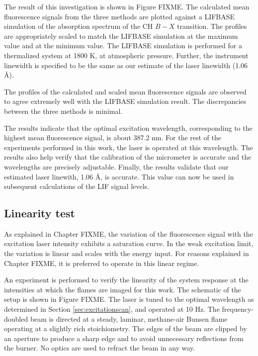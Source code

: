 The result of this investigation is shown in Figure FIXME.
The calculated mean fluorescence signals from the three methods are plotted against a LIFBASE simulation of the absorption spectrum of the CH \(B-X\) transition.
The profiles are appropriately scaled to match the LIFBASE simulation at the maximum value and at the minimum value.
The LIFBASE simulation is performed for a thermalized system at 1800 K, at atmospheric pressure.
Further, the instrument linewidth is specified to be the same as our estimate of the laser linewidth (1.06 \AA).

The profiles of the calculated and scaled mean fluorescence signals are observed to agree extremely well with the LIFBASE simulation result.
The discrepancies between the three methods is minimal.

The results indicate that the optimal excitation wavelength, corresponding to the highest mean fluorescence signal, is about 387.2 nm.
For the rest of the experiments performed in this work, the laser is operated at this wavelength.
The results also help verify that the calibration of the micrometer is accurate and the wavelengths are precisely adjustable.
Finally, the results validate that our estimated laser linewith, 1.06 \AA, is accurate.
This value can now be used in subsequent calculations of the LIF signal levels.

\subsection{Linearity test}



As explained in Chapter FIXME, the variation of the fluorescence signal with the excitation laser intensity exhibits a saturation curve.
In the weak excitation limit, the variation is linear and scales with the energy input.
For reasons explained in Chapter FIXME, it is preferred to operate in this linear regime.

An experiment is performed to verify the linearity of the system response at the intensities at which the flames are imaged for this work.
The schematic of the setup is shown in Figure FIXME.
The laser is tuned to the optimal wavelength as determined in Section \ref{sec:excitationscan}, and operated at 10 Hz.
The frequency-doubled beam is directed at a steady, laminar, methane-air Bunsen flame operating at a slightly rich stoichiometry.
The edges of the beam are clipped by an aperture to produce a sharp edge and to avoid unnecessary reflections from the burner.
No optics are used to refract the beam in any way.

